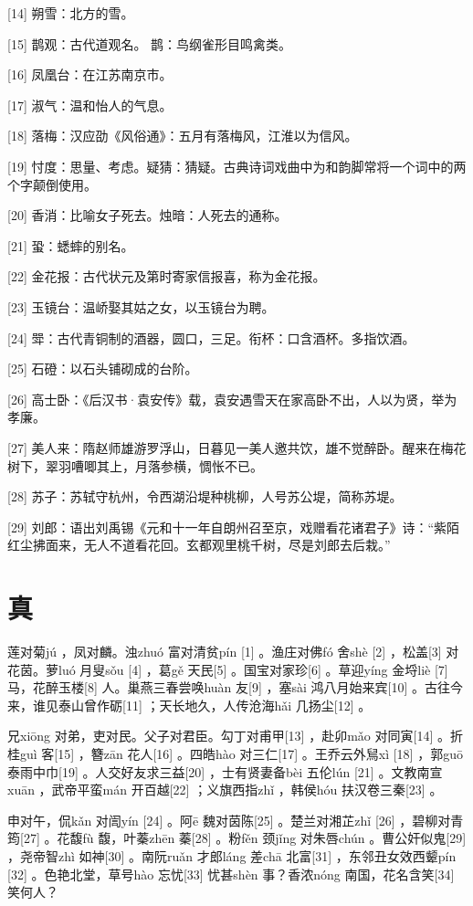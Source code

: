 \documentclass[12pt,UTF8]{ctexbook}
\begin{document}
[14] 朔雪：北方的雪。

[15] 鹊观：古代道观名。 鹊：鸟纲雀形目鸣禽类。

[16] 凤凰台：在江苏南京市。

[17] 淑气：温和怡人的气息。

[18] 落梅：汉应劭《风俗通》：五月有落梅风，江淮以为信风。

[19] 忖度：思量、考虑。疑猜：猜疑。古典诗词戏曲中为和韵脚常将一个词中的两个字颠倒使用。

[20] 香消：比喻女子死去。烛暗：人死去的通称。

[21] 蛩：蟋蟀的别名。

[22] 金花报：古代状元及第时寄家信报喜，称为金花报。

[23] 玉镜台：温峤娶其姑之女，以玉镜台为聘。

[24] 斝：古代青铜制的酒器，圆口，三足。衔杯：口含酒杯。多指饮酒。

[25] 石磴：以石头铺砌成的台阶。

[26] 高士卧：《后汉书·袁安传》载，袁安遇雪天在家高卧不出，人以为贤，举为孝廉。

[27] 美人来：隋赵师雄游罗浮山，日暮见一美人邀共饮，雄不觉醉卧。醒来在梅花树下，翠羽嘈唧其上，月落参横，惆怅不已。

[28] 苏子：苏轼守杭州，令西湖沿堤种桃柳，人号苏公堤，简称苏堤。

[29] 刘郎：语出刘禹锡《元和十一年自朗州召至京，戏赠看花诸君子》诗：“紫陌红尘拂面来，无人不道看花回。玄都观里桃千树，尽是刘郎去后栽。”





\chapter{真}


莲对菊jú ，凤对麟。浊zhuó 富对清贫pín [1] 。渔庄对佛fó 舍shè [2] ，松盖[3] 对花茵。萝luó 月叟sǒu [4] ，葛gě 天民[5] 。国宝对家珍[6] 。草迎yíng 金埒liè [7] 马，花醉玉楼[8] 人。巢燕三春尝唤huàn 友[9] ，塞sài 鸿八月始来宾[10] 。古往今来，谁见泰山曾作砺[11] ；天长地久，人传沧海hǎi 几扬尘[12] 。

兄xiōng 对弟，吏对民。父子对君臣。勾丁对甫甲[13] ，赴卯mǎo 对同寅[14] 。折桂guì 客[15] ，簪zān 花人[16] 。四皓hào 对三仁[17] 。王乔云外舃xì [18] ，郭guō 泰雨中巾[19] 。人交好友求三益[20] ，士有贤妻备bèi 五伦lún [21] 。文教南宣xuān ，武帝平蛮mán 开百越[22] ；义旗西指zhǐ ，韩侯hóu 扶汉卷三秦[23] 。

申对午，侃kǎn 对訚yín [24] 。阿ē 魏对茵陈[25] 。楚兰对湘芷zhǐ [26] ，碧柳对青筠[27] 。花馥fù 馥，叶蓁zhēn 蓁[28] 。粉fěn 颈jǐng 对朱唇chún 。曹公奸似鬼[29] ，尧帝智zhì 如神[30] 。南阮ruǎn 才郎láng 差chā 北富[31] ，东邻丑女效西颦pín [32] 。色艳北堂，草号hào 忘忧[33] 忧甚shèn 事？香浓nóng 南国，花名含笑[34] 笑何人？
\end{document}
